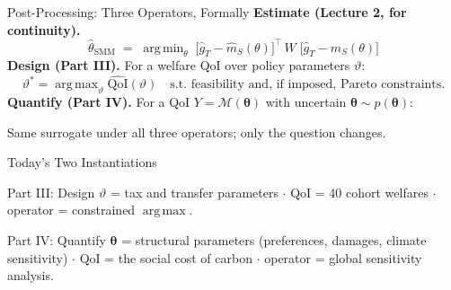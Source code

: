 \documentclass[aspectratio=169,11pt]{beamer}
\DeclareMathOperator*{\argmin}{arg\,min}
\DeclareMathOperator*{\argmax}{arg\,max}
\begin{document}
\begin{frame}{Post-Processing: Three Operators, Formally}
\footnotesize
\textbf{Estimate (Lecture 2, for continuity).}
\[
    \widehat\theta_{\text{SMM}} \;=\; \argmin_{\theta} \;
        \bigl[\widehat g_T - \widehat m_S(\theta)\bigr]^{\!\top}\, W \;
        \bigl[\widehat g_T - \widehat m_S(\theta)\bigr]
\]
\textbf{Design (Part III).} For a welfare QoI over policy parameters $\vartheta$:
\[
   \vartheta^* = \argmax_{\vartheta} \widehat{\mathrm{QoI}}(\vartheta)
   \quad \text{s.t. feasibility and, if imposed, Pareto constraints.}
\]
\textbf{Quantify (Part IV).} For a QoI $Y = \mathcal{M}(\bm{\theta})$ with uncertain $\bm{\theta} \sim p(\bm{\theta})$:
\begin{center}
\end{center}
\vspace{0.1em}
Same surrogate under all three operators; only the question changes.
\end{frame}

\begin{frame}{Today's Two Instantiations}
\begin{block}{Part III: Design}
$\vartheta$ = tax and transfer parameters $\cdot$ QoI = 40 cohort welfares $\cdot$ operator = constrained $\argmax$.
\end{block}
\vspace{0.8em}
\begin{block}{Part IV: Quantify}
$\bm{\theta}$ = structural parameters (preferences, damages, climate sensitivity) $\cdot$ QoI = the social cost of carbon $\cdot$ operator = global sensitivity analysis.
\end{block}
\end{frame}


\end{document}
